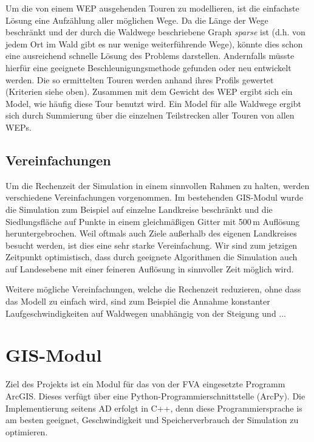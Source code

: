 \documentclass[parskip=half,german]{scrartcl}
\begin{document}
Um die von einem WEP ausgehenden Touren zu modellieren, ist die einfachste
Lösung eine Aufzählung aller möglichen Wege. Da die Länge der Wege beschränkt
und der durch die Waldwege beschriebene Graph \emph{sparse} ist (d.h. von jedem
Ort im Wald gibt es nur wenige weiterführende Wege), könnte dies schon eine
ausreichend schnelle Lösung des Problems darstellen. Andernfalls müsste hierfür
eine geeignete Beschleunigungsmethode gefunden oder neu entwickelt werden. 
Die so ermittelten Touren werden anhand ihres Profils gewertet (Kriterien
siehe oben). Zusammen mit dem Gewicht des WEP ergibt sich ein Model, wie häufig
diese Tour benutzt wird. Ein Model für alle Waldwege ergibt sich durch
Summierung über die einzelnen Teilstrecken aller Touren von allen WEPs.

\subsection*{Vereinfachungen}
Um die Rechenzeit der Simulation in einem sinnvollen Rahmen zu halten, werden
verschiedene Vereinfachungen vorgenommen. Im bestehenden GIS-Modul wurde die
Simulation zum Beispiel auf einzelne Landkreise beschränkt und die
Siedlungsfläche auf Punkte in einem gleichmäßigen Gitter mit 500\,m Auflösung
heruntergebrochen. Weil oftmals auch Ziele außerhalb des eigenen Landkreises
besucht werden, ist dies eine sehr starke Vereinfachung. Wir sind zum jetzigen
Zeitpunkt optimistisch, dass durch geeignete Algorithmen die Simulation auch auf
Landesebene mit einer feineren Auflösung in sinnvoller Zeit möglich wird. 

Weitere mögliche Vereinfachungen, welche die Rechenzeit reduzieren, ohne dass
das Modell zu einfach wird, sind zum Beispiel die Annahme konstanter
Laufgeschwindigkeiten auf Waldwegen unabhängig von der Steigung und ...

    
  
\section{GIS-Modul}
Ziel des Projekts ist ein Modul für das von der FVA eingesetzte Programm ArcGIS.
Dieses verfügt über eine Python-Programmierschnittstelle (ArcPy). Die
Implementierung seitens AD erfolgt in C++, denn diese Programmiersprache is am
besten geeignet, Geschwindigkeit und Speicherverbrauch der Simulation zu
optimieren. 
\end{document}
